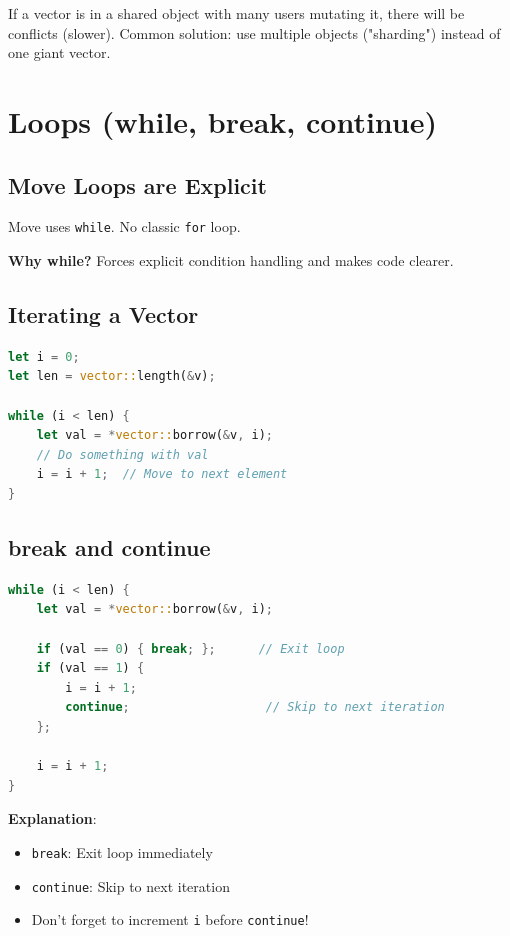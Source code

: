 \documentclass[11pt]{article}
\begin{document}
If a vector is in a shared object with many users mutating it, there will be conflicts (slower). Common solution: use multiple objects ("sharding") instead of one giant vector.

\section{Loops (while, break, continue)}

\subsection{Move Loops are Explicit}

Move uses \texttt{while}. No classic \texttt{for} loop.

\begin{noteBox}
\textbf{Why while?} Forces explicit condition handling and makes code clearer.
\end{noteBox}

\subsection{Iterating a Vector}

\begin{lstlisting}[language=Rust]
let i = 0;
let len = vector::length(&v);

while (i < len) {
    let val = *vector::borrow(&v, i);
    // Do something with val
    i = i + 1;  // Move to next element
}
\end{lstlisting}

\subsection{break and continue}

\begin{lstlisting}[language=Rust]
while (i < len) {
    let val = *vector::borrow(&v, i);
    
    if (val == 0) { break; };      // Exit loop
    if (val == 1) { 
        i = i + 1;
        continue;                   // Skip to next iteration
    };
    
    i = i + 1;
}
\end{lstlisting}

\begin{noteBox}
\textbf{Explanation}:
\begin{itemize}
  \item \texttt{break}: Exit loop immediately
  \item \texttt{continue}: Skip to next iteration
  \item Don't forget to increment \texttt{i} before \texttt{continue}!
\end{itemize}
\end{noteBox}
\end{document}
